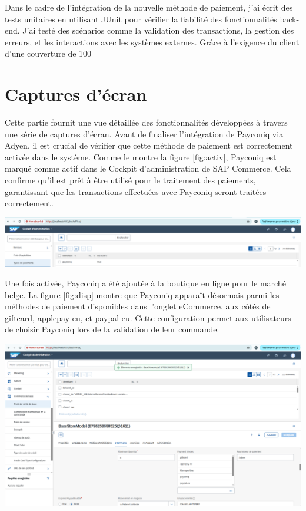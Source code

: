 Dans le cadre de l'intégration de la nouvelle méthode de paiement, j'ai écrit des tests unitaires en utilisant JUnit pour vérifier la fiabilité des fonctionnalités back-end. J'ai testé des scénarios comme la validation des transactions, la gestion des erreurs, et les interactions avec les systèmes externes. Grâce à l'exigence du client d'une couverture de 100%
\section{Captures d'écran}
Cette partie fournit une vue détaillée des fonctionnalités développées à travers une série de captures d’écran.
Avant de finaliser l'intégration de Payconiq via Adyen, il est crucial de vérifier que cette méthode de paiement est correctement activée dans le système. Comme le montre la figure \ref{fig:activ}, Payconiq est marqué comme actif dans le Cockpit d'administration de SAP Commerce. 
Cela confirme qu'il est prêt à être utilisé pour le traitement des paiements, garantissant que les transactions effectuées avec Payconiq seront traitées correctement.
\begin{center}
    \centering
    \includegraphics[width=19cm]{Figures/Screens/VERIFIER QUE payment activer.png}
    \label{fig:activ}
\end{center}
Une fois activée, Payconiq a été ajoutée à la boutique en ligne pour le marché belge. La figure \ref{fig:disp} montre que Payconiq apparaît désormais parmi les méthodes de paiement disponibles dans l'onglet eCommerce, aux côtés de giftcard, applepay-eu, et paypal-eu. Cette configuration permet aux utilisateurs de choisir Payconiq lors de la validation de leur commande.
\begin{center}
    \centering
    \includegraphics[width=19cm]{Figures/Screens/activation du payconiq pour belge.png}
    \label{fig:disp}
\end{center}
